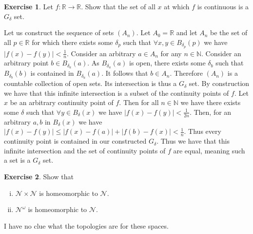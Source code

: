 \documentclass{article}
\theoremstyle{definition}
\newtheorem{exer}{Exercise}[section]
\newcommand{\N}{\mathbb{N}}
\newcommand{\R}{\mathbb{R}}
\newcommand{\abs}[1]{\lvert#1\rvert}
\newlength{\defparindent}
\newenvironment{answer}
    {\begin{mdframed}[backgroundcolor=gray!15, linewidth=0pt] \setlength{\parindent}{\defparindent}}
    {\end{mdframed}}
\begin{document}
\begin{exer}
    Let $f: \R \to \R$. Show that the set of all $x$ at which $f$ is continuous is a $G_\delta$ set.
    \begin{answer}
        Let us construct the sequence of sets $(A_n)$. Let $A_0 = \R$ and let $A_n$ be the set of all $p \in \R$ for which there exists some $\delta_p$ such that $\forall x, y \in B_{\delta_p}(p)$ we have $\abs{f(x) - f(y)} < \frac{1}{n}$. Consider an arbitrary $a \in A_n$ for any $n \in \N$. Consider an arbitrary point $b \in B_{\delta_a}(a)$. As $B_{\delta_a}(a)$ is open, there exists some $\delta_b$ such that $B_{\delta_b}(b)$ is contained in $B_{\delta_a}(a)$. It follows that $b \in A_n$. Therefore $(A_n)$ is a countable collection of open sets. Its intersection is thus a $G_\delta$ set. By construction we have that this infinite intersection is a subset of the continuity points of $f$. Let $x$ be an arbitrary continuity point of $f$. Then for all $n \in \N$ we have there exists some $\delta$ such that $\forall y \in B_{\delta}(x)$ we have $\abs{f(x) - f(y)} < \frac{1}{2n}$. Then, for an arbitrary $a, b$ in $B_{\delta}(x)$ we have $\abs{f(x) - f(y)} \le \abs{f(x) - f(a)} + \abs{f(b) - f(x)} < \frac{1}{n}$. Thus every continuity point is contained in our constructed $G_\delta$. Thus we have that this infinite intersection and the set of continuity points of $f$ are equal, meaning such a set is a $G_\delta$ set.
    \end{answer}
\end{exer}

\begin{exer}
    Show that 
    \begin{enumerate}[(i)]
        \item $\mathcal{N} \times \mathcal{N}$ is homeomorphic to $\mathcal{N}$.
        \item $\mathcal{N}^\omega$ is homeomorphic to $\mathcal{N}$.
    \end{enumerate}
    \begin{answer}
        I have no clue what the topologies are for these spaces.
    \end{answer}
\end{exer}

\newpage
\end{document}
